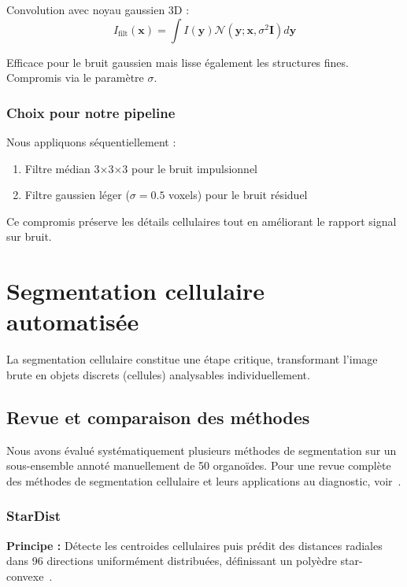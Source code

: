 Convolution avec noyau gaussien 3D :
\[
I_{\text{filt}}(\mathbf{x}) = \int I(\mathbf{y}) \mathcal{N}(\mathbf{y}; \mathbf{x}, \sigma^2 \mathbf{I}) d\mathbf{y}
\]

Efficace pour le bruit gaussien mais lisse également les structures fines. Compromis via le paramètre $\sigma$.

\subsubsection{Choix pour notre pipeline}

Nous appliquons séquentiellement :
\begin{enumerate}
    \item Filtre médian 3×3×3 pour le bruit impulsionnel
    \item Filtre gaussien léger ($\sigma = 0.5$ voxels) pour le bruit résiduel
\end{enumerate}

Ce compromis préserve les détails cellulaires tout en améliorant le rapport signal sur bruit.

\section{Segmentation cellulaire automatisée}

La segmentation cellulaire constitue une étape critique, transformant l'image brute en objets discrets (cellules) analysables individuellement.

\subsection{Revue et comparaison des méthodes}

Nous avons évalué systématiquement plusieurs méthodes de segmentation sur un sous-ensemble annoté manuellement de 50 organoïdes. Pour une revue complète des méthodes de segmentation cellulaire et leurs applications au diagnostic, voir~\cite{Nunes2024,Rayed2024,Wang2022Segmentation}.

\subsubsection{StarDist}

\textbf{Principe :}
Détecte les centroides cellulaires puis prédit des distances radiales dans 96 directions uniformément distribuées, définissant un polyèdre star-convexe~\cite{Schmidt2018}.

